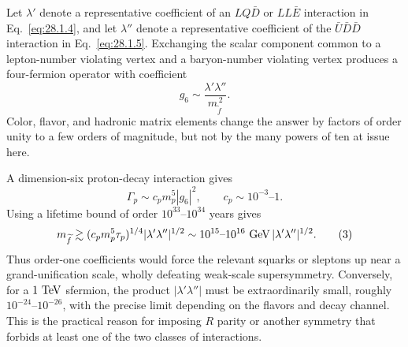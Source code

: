 \ExerciseEditorialNote

\begin{enumerate}
  Let \(\lambda'\) denote a representative coefficient of an
  \(LQ\bar D\) or \(LL\bar E\) interaction in
  Eq.~\eqref{eq:28.1.4}, and let \(\lambda''\) denote a representative
  coefficient of the \(\bar U\bar D\bar D\) interaction in
  Eq.~\eqref{eq:28.1.5}.  Exchanging the scalar component common to a
  lepton-number violating vertex and a baryon-number violating vertex
  produces a four-fermion operator with coefficient
  \[
    g_6\sim\frac{\lambda'\lambda''}{m_{\widetilde f}^{\,2}} .
    \tag{1}
  \]
  Color, flavor, and hadronic matrix elements change the answer by
  factors of order unity to a few orders of magnitude, but not by the
  many powers of ten at issue here.

  A dimension-six proton-decay interaction gives
  \[
    \Gamma_p\sim c_p m_p^5|g_6|^2,\qquad
    c_p\sim10^{-3}\text{--}1.
    \tag{2}
  \]
  Using a lifetime bound of order \(10^{33}\)--\(10^{34}\) years gives
  \[
    m_{\widetilde f}
      \gtrsim
      (c_pm_p^5\tau_p)^{1/4}
      |\lambda'\lambda''|^{1/2}
      \sim
      10^{15}\text{--}10^{16}\ {\rm GeV}\,
      |\lambda'\lambda''|^{1/2}.
    \tag{3}
  \]
  Thus order-one coefficients would force the relevant squarks or
  sleptons up near a grand-unification scale, wholly defeating
  weak-scale supersymmetry.  Conversely, for a \(1\ {\rm TeV}\)
  sfermion, the product \(|\lambda'\lambda''|\) must be extraordinarily
  small, roughly \(10^{-24}\)--\(10^{-26}\), with the precise limit
  depending on the flavors and decay channel.  This is the practical
  reason for imposing \(R\) parity or another symmetry that forbids at
  least one of the two classes of interactions.


\end{enumerate}
